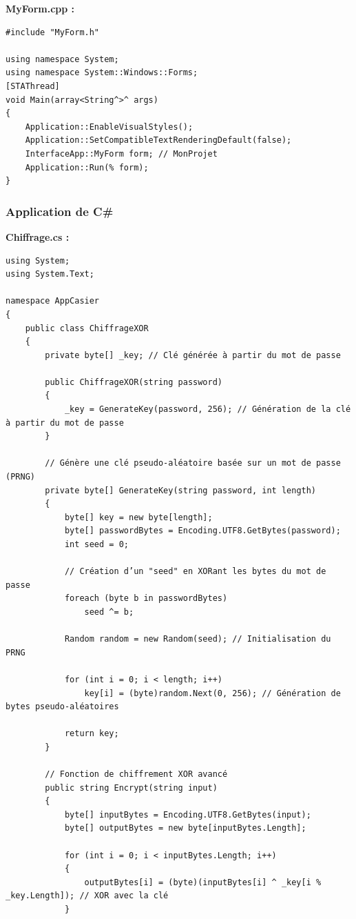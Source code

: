 \documentclass[main.tex]{subfiles}
\begin{document}
\textbf{MyForm.cpp :}

\begin{lstlisting}
#include "MyForm.h"

using namespace System;
using namespace System::Windows::Forms;
[STAThread]
void Main(array<String^>^ args)
{
	Application::EnableVisualStyles();
	Application::SetCompatibleTextRenderingDefault(false);
	InterfaceApp::MyForm form; // MonProjet
	Application::Run(% form);
}
\end{lstlisting}


\subsubsection{Application de C\#}

\textbf{Chiffrage.cs :}

\begin{lstlisting}
using System;
using System.Text;

namespace AppCasier
{
    public class ChiffrageXOR
    {
        private byte[] _key; // Clé générée à partir du mot de passe

        public ChiffrageXOR(string password)
        {
            _key = GenerateKey(password, 256); // Génération de la clé à partir du mot de passe
        }

        // Génère une clé pseudo-aléatoire basée sur un mot de passe (PRNG)
        private byte[] GenerateKey(string password, int length)
        {
            byte[] key = new byte[length];
            byte[] passwordBytes = Encoding.UTF8.GetBytes(password);
            int seed = 0;

            // Création d’un "seed" en XORant les bytes du mot de passe
            foreach (byte b in passwordBytes)
                seed ^= b;

            Random random = new Random(seed); // Initialisation du PRNG

            for (int i = 0; i < length; i++)
                key[i] = (byte)random.Next(0, 256); // Génération de bytes pseudo-aléatoires

            return key;
        }

        // Fonction de chiffrement XOR avancé
        public string Encrypt(string input)
        {
            byte[] inputBytes = Encoding.UTF8.GetBytes(input);
            byte[] outputBytes = new byte[inputBytes.Length];

            for (int i = 0; i < inputBytes.Length; i++)
            {
                outputBytes[i] = (byte)(inputBytes[i] ^ _key[i % _key.Length]); // XOR avec la clé
            }


\end{lstlisting}
\end{document}
